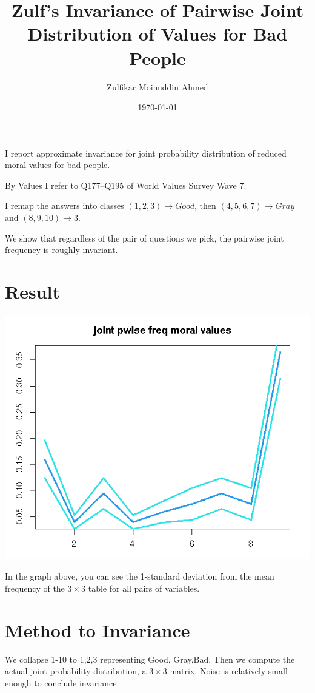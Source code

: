 \documentclass{amsart}
\title{Zulf's Invariance of Pairwise Joint Distribution of Values for Bad People}
\author{Zulfikar Moinuddin Ahmed}
\date{\today}
\begin{document}
\maketitle

I report approximate invariance for joint probability distribution of reduced moral values for bad people.

By Values I refer to Q177--Q195 of World Values Survey Wave 7.

I remap the answers into classes $(1,2,3)\rightarrow Good$, then $(4,5,6,7)\rightarrow Gray$ and $(8,9,10)\rightarrow 3$.

We show that regardless of the pair of questions we pick, the pairwise joint frequency is roughly invariant.

\section{Result}

\includegraphics[scale=0.8]{jpwfreq.jpeg}

In the graph above, you can see the 1-standard deviation from the mean frequency of the $3\times 3$ table for all pairs of variables.  

\section{Method to Invariance}

We collapse 1-10 to 1,2,3 representing Good, Gray,Bad.  Then we compute the actual joint probability distribution, a $3\times 3$ matrix.    Noise is relatively small enough to conclude invariance.
\end{document}
